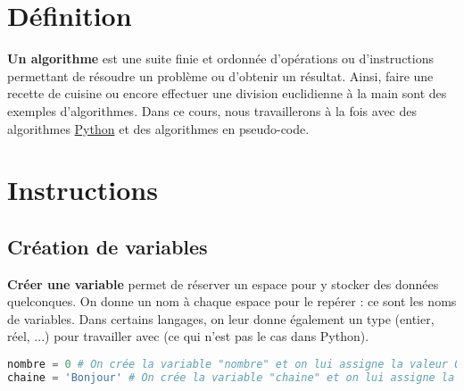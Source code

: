 






	\section{Définition}

	\textbf{Un algorithme} est une suite finie et ordonnée d’opérations ou d'instructions permettant de résoudre un problème ou d'obtenir un résultat. Ainsi, faire une recette de cuisine ou encore effectuer une division euclidienne à la main sont des exemples d'algorithmes.
	\newpar
	Dans ce cours, nous travaillerons à la fois avec des algorithmes \href{https://python.org}{Python} et des algorithmes en pseudo-code.

	\section{Instructions}

	\subsection{Création de variables}

	\textbf{Créer une variable} permet de réserver un espace pour y stocker des données quelconques.
	\newline
	On donne un nom à chaque espace pour le repérer : ce sont les noms de variables.
	Dans certains langages, on leur donne également un type (entier, réel, ...) pour travailler avec (ce qui n'est pas le cas dans Python).

	\begin{formula}[En python]
		\entretitreetliste
\begin{lstlisting}[language=python]
nombre = 0 # On crée la variable "nombre" et on lui assigne la valeur 0.
chaine = 'Bonjour' # On crée la variable "chaine" et on lui assigne la valeur 'Bonjour'.
\end{lstlisting}
	\end{formula}

